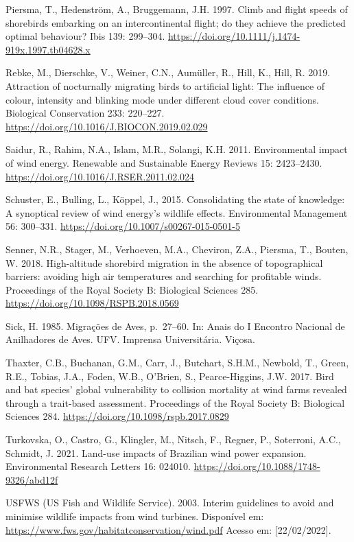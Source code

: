 \documentclass[
  oneside]{scrbook}
\begin{document}
Piersma, T., Hedenström, A., Bruggemann, J.H. 1997. Climb and flight speeds of shorebirds embarking on an intercontinental flight; do they achieve the predicted optimal behaviour? Ibis 139: 299--304. \url{https://doi.org/10.1111/j.1474-919x.1997.tb04628.x}

Rebke, M., Dierschke, V., Weiner, C.N., Aumüller, R., Hill, K., Hill, R. 2019. Attraction of nocturnally migrating birds to artificial light: The influence of colour, intensity and blinking mode under different cloud cover conditions. Biological Conservation 233: 220--227. \url{https://doi.org/10.1016/J.BIOCON.2019.02.029}

Saidur, R., Rahim, N.A., Islam, M.R., Solangi, K.H. 2011. Environmental impact of wind energy. Renewable and Sustainable Energy Reviews 15: 2423--2430. \url{https://doi.org/10.1016/J.RSER.2011.02.024}

Schuster, E., Bulling, L., Köppel, J., 2015. Consolidating the state of knowledge: A synoptical review of wind energy's wildlife effects. Environmental Management 56: 300--331. \url{https://doi.org/10.1007/s00267-015-0501-5}

Senner, N.R., Stager, M., Verhoeven, M.A., Cheviron, Z.A., Piersma, T., Bouten, W. 2018. High-altitude shorebird migration in the absence of topographical barriers: avoiding high air temperatures and searching for profitable winds. Proceedings of the Royal Society B: Biological Sciences 285. \url{https://doi.org/10.1098/RSPB.2018.0569}

Sick, H. 1985. Migrações de Aves, p.~27--60. In: Anais do I Encontro Nacional de Anilhadores de Aves. UFV. Imprensa Universitária. Viçosa.

Thaxter, C.B., Buchanan, G.M., Carr, J., Butchart, S.H.M., Newbold, T., Green, R.E., Tobias, J.A., Foden, W.B., O'Brien, S., Pearce-Higgins, J.W. 2017. Bird and bat species' global vulnerability to collision mortality at wind farms revealed through a trait-based assessment. Proceedings of the Royal Society B: Biological Sciences 284. \url{https://doi.org/10.1098/rspb.2017.0829}

Turkovska, O., Castro, G., Klingler, M., Nitsch, F., Regner, P., Soterroni, A.C., Schmidt, J. 2021. Land-use impacts of Brazilian wind power expansion. Environmental Research Letters 16: 024010. \url{https://doi.org/10.1088/1748-9326/abd12f}

USFWS (US Fish and Wildlife Service). 2003. Interim guidelines to avoid and minimise wildlife impacts from wind turbines. Disponível em: \url{https://www.fws.gov/habitatconservation/wind.pdf} Acesso em: {[}22/02/2022{]}.
\end{document}
